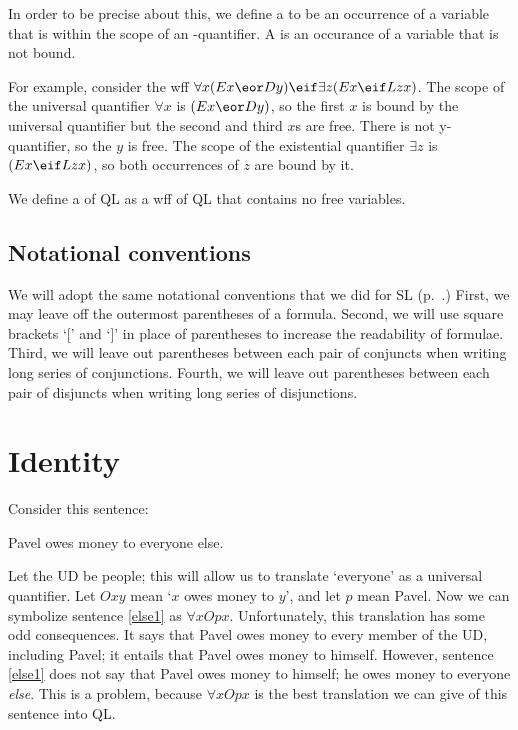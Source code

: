In order to be precise about this, we define a  to be an occurrence of a variable  that is within the scope of an -quantifier. A  is an occurance of a variable that is not bound.

For example, consider the wff $\forall x(Ex \eor Dy) \eif \exists z(Ex \eif Lzx)$. The scope of the universal quantifier $\forall x$ is $(Ex \eor Dy)$, so the first $x$ is bound by the universal quantifier but the second and third $x$s are free. There is not y-quantifier, so the $y$ is free. The scope of the existential quantifier $\exists z$ is $(Ex \eif Lzx)$, so both occurrences of $z$ are bound by it.

We define a  of QL as a wff of QL that contains no free variables.



\subsection{Notational conventions}

We will adopt the same notational conventions that we did for SL (p.~\pageref{SLconventions}.) First, we may leave off the outermost parentheses of a formula. Second, we will use square brackets `[' and `]' in place of parentheses to increase the readability of formulae. Third, we will leave out parentheses between each pair of conjuncts when writing long series of conjunctions. Fourth, we will leave out parentheses between each pair of disjuncts when writing long series of disjunctions.

\section{Identity}
\label{sec.identity}

Consider this sentence:
\begin{earg}
\item[\ex{else1}] Pavel owes money to everyone else.
\end{earg}
Let the UD be people; this will allow us to translate `everyone' as a universal quantifier. Let $Oxy$ mean `$x$ owes money to $y$', and let $p$ mean Pavel. Now we can symbolize sentence \ref{else1} as $\forall x Opx$. Unfortunately, this translation has some odd consequences. It says that Pavel owes money to every member of the UD, including Pavel; it entails that Pavel owes money to himself. However, sentence \ref{else1} does not say that Pavel owes money to himself; he owes money to everyone \emph{else}. This is a problem, because $\forall x Opx$ is the best translation we can give of this sentence into QL.

